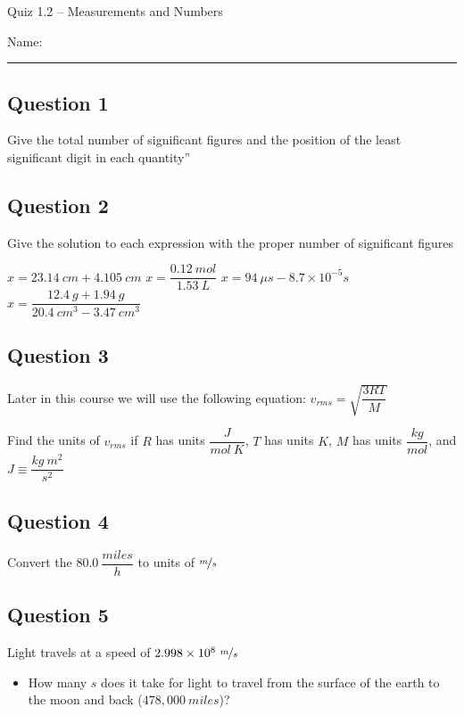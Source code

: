 \documentclass[11pt, letterpaper]{memoir}
\begin{document}
	\begin{center}
		{\large Quiz 1.2 --	Measurements and Numbers}
	\end{center}
	{\large Name: \rule[-1mm]{4in}{.1pt} 
	\subsection*{Question 1}
	Give the total number of significant figures and the position of the least significant digit in each quantity”
	
	
	\vspace{3em}
	\subsection*{Question 2}
	Give the solution to each expression with the proper number of significant figures
	
	\noindent$x = 23.14~cm+4.105~cm$ \hspace{2em} $x = \dfrac{0.12~mol}{1.53~L}$ \hspace{2em} $x=94~\mu s - 8.7\times10^{-5}s$ \hspace{2em} $x=\dfrac{12.4~g+1.94~g}{20.4~cm^3-3.47~cm^3}$  
	
	\vspace{3em}
	\subsection*{Question 3}
	Later in this course we will use the following equation: $v_{rms}=\sqrt{\dfrac{3RT}{M}}$
	
	\noindent Find the units of $v_{rms}$ if $R$ has units $\dfrac{J}{mol~K}$, $T$ has units $K$, $M$ has units $\dfrac{kg}{mol}$, and $J\equiv \dfrac{kg~m^2}{s^2}$
	
	\vspace{3em}
	\subsection*{Question 4}
	Convert the $80.0~\dfrac{miles}{h}$ to units of $\nicefrac{m}{s}$ 
	
	\vspace{3em}
	\subsection*{Question 5}
	Light travels at a speed of $2.998\times10^8~\nicefrac{m}{s}$
	\begin{itemize}
		\item How many $s$ does it take for light to travel from the surface of the earth to the moon and back ($478,000~miles$)?
		

\end{itemize}}
\end{document}
